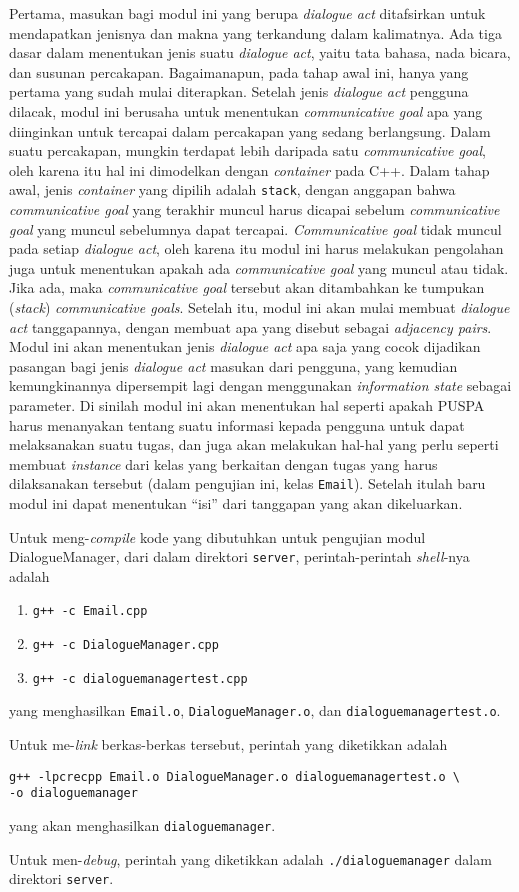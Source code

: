 Pertama, masukan bagi modul ini yang berupa \textit{dialogue act} ditafsirkan untuk mendapatkan jenisnya dan makna yang terkandung dalam kalimatnya.
Ada tiga dasar dalam menentukan jenis suatu \textit{dialogue act},
yaitu tata bahasa, nada bicara, dan susunan percakapan.
Bagaimanapun, pada tahap awal ini, hanya yang pertama yang sudah mulai diterapkan.
Setelah jenis \textit{dialogue act} pengguna dilacak,
modul ini berusaha untuk menentukan \textit{communicative goal} apa yang diinginkan untuk tercapai dalam percakapan yang sedang berlangsung.
Dalam suatu percakapan, mungkin terdapat lebih daripada satu \textit{communicative goal},
oleh karena itu hal ini dimodelkan dengan \textit{container} pada C++.
Dalam tahap awal, jenis \textit{container} yang dipilih adalah \texttt{stack},
dengan anggapan bahwa \textit{communicative goal} yang terakhir muncul harus dicapai sebelum \textit{communicative goal} yang muncul sebelumnya dapat tercapai.
\textit{Communicative goal} tidak muncul pada setiap \textit{dialogue act},
oleh karena itu modul ini harus melakukan pengolahan juga untuk menentukan apakah ada \textit{communicative goal} yang muncul atau tidak.
Jika ada, maka \textit{communicative goal} tersebut akan ditambahkan ke tumpukan (\textit{stack}) \textit{communicative goals}.
Setelah itu, modul ini akan mulai membuat \textit{dialogue act} tanggapannya,
dengan membuat apa yang disebut sebagai \textit{adjacency pairs}.
Modul ini akan menentukan jenis \textit{dialogue act} apa saja yang cocok dijadikan pasangan bagi jenis \textit{dialogue act} masukan dari pengguna,
yang kemudian kemungkinannya dipersempit lagi dengan menggunakan \textit{information state} sebagai parameter.
Di sinilah modul ini akan menentukan hal seperti apakah PUSPA harus menanyakan tentang suatu informasi kepada pengguna untuk dapat melaksanakan suatu tugas,
dan juga akan melakukan hal-hal yang perlu seperti membuat \textit{instance} dari kelas yang berkaitan dengan tugas yang harus dilaksanakan tersebut (dalam pengujian ini, kelas \texttt{Email}).
Setelah itulah baru modul ini dapat menentukan ``isi'' dari tanggapan yang akan dikeluarkan.

Untuk meng-\textit{compile} kode yang dibutuhkan untuk pengujian modul DialogueManager,
dari dalam direktori \texttt{server},
perintah-perintah \textit{shell}-nya adalah
\begin{enumerate}
\item \verb!g++ -c Email.cpp!
\item \verb!g++ -c DialogueManager.cpp!
\item \verb!g++ -c dialoguemanagertest.cpp!
\end{enumerate}
yang menghasilkan \texttt{Email.o}, \texttt{DialogueManager.o}, dan \texttt{dialoguemanagertest.o}.

Untuk me-\textit{link} berkas-berkas tersebut,
perintah yang diketikkan adalah
\begin{verbatim}
g++ -lpcrecpp Email.o DialogueManager.o dialoguemanagertest.o \
-o dialoguemanager
\end{verbatim}
yang akan menghasilkan \texttt{dialoguemanager}.

Untuk men-\textit{debug},
perintah yang diketikkan adalah \verb!./dialoguemanager! dalam direktori \texttt{server}.
